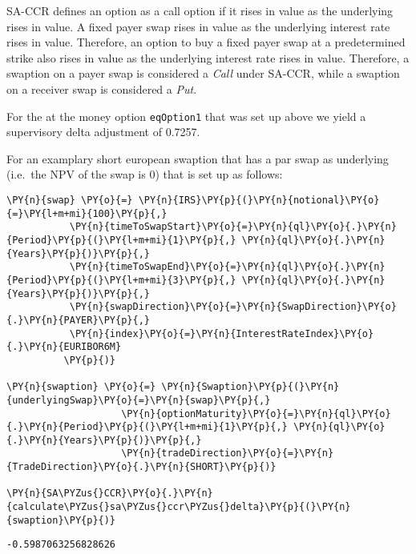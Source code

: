 SA-CCR defines an option as a call option if it rises in value as the
underlying rises in value. A fixed payer swap rises in value as the
underlying interest rate rises in value. Therefore, an option to buy a
fixed payer swap at a predetermined strike also rises in value as the
underlying interest rate rises in value. Therefore, a swaption on a
payer swap is considered a \emph{Call} under SA-CCR, while a swaption on
a receiver swap is considered a \emph{Put}.

    For the at the money option \texttt{eqOption1} that was set up above we
yield a supervisory delta adjustment of 0.7257.

    
    For an examplary short european swaption that has a par swap as
underlying (i.e.~the NPV of the swap is 0) that is set up as follows:

    \begin{tcolorbox}[breakable, size=fbox, boxrule=1pt, pad at break*=1mm,colback=cellbackground, colframe=cellborder]
\begin{Verbatim}[commandchars=\\\{\}]
\PY{n}{swap} \PY{o}{=} \PY{n}{IRS}\PY{p}{(}\PY{n}{notional}\PY{o}{=}\PY{l+m+mi}{100}\PY{p}{,}
           \PY{n}{timeToSwapStart}\PY{o}{=}\PY{n}{ql}\PY{o}{.}\PY{n}{Period}\PY{p}{(}\PY{l+m+mi}{1}\PY{p}{,} \PY{n}{ql}\PY{o}{.}\PY{n}{Years}\PY{p}{)}\PY{p}{,}
           \PY{n}{timeToSwapEnd}\PY{o}{=}\PY{n}{ql}\PY{o}{.}\PY{n}{Period}\PY{p}{(}\PY{l+m+mi}{3}\PY{p}{,} \PY{n}{ql}\PY{o}{.}\PY{n}{Years}\PY{p}{)}\PY{p}{,}
           \PY{n}{swapDirection}\PY{o}{=}\PY{n}{SwapDirection}\PY{o}{.}\PY{n}{PAYER}\PY{p}{,}
           \PY{n}{index}\PY{o}{=}\PY{n}{InterestRateIndex}\PY{o}{.}\PY{n}{EURIBOR6M}
          \PY{p}{)}

\PY{n}{swaption} \PY{o}{=} \PY{n}{Swaption}\PY{p}{(}\PY{n}{underlyingSwap}\PY{o}{=}\PY{n}{swap}\PY{p}{,}
                    \PY{n}{optionMaturity}\PY{o}{=}\PY{n}{ql}\PY{o}{.}\PY{n}{Period}\PY{p}{(}\PY{l+m+mi}{1}\PY{p}{,} \PY{n}{ql}\PY{o}{.}\PY{n}{Years}\PY{p}{)}\PY{p}{,}
                    \PY{n}{tradeDirection}\PY{o}{=}\PY{n}{TradeDirection}\PY{o}{.}\PY{n}{SHORT}\PY{p}{)}

\PY{n}{SA\PYZus{}CCR}\PY{o}{.}\PY{n}{calculate\PYZus{}sa\PYZus{}ccr\PYZus{}delta}\PY{p}{(}\PY{n}{swaption}\PY{p}{)}
\end{Verbatim}
\end{tcolorbox}

            \begin{tcolorbox}[breakable, size=fbox, boxrule=.5pt, pad at break*=1mm, opacityfill=0]
\begin{Verbatim}[commandchars=\\\{\}]
-0.5987063256828626
\end{Verbatim}
\end{tcolorbox}
        
